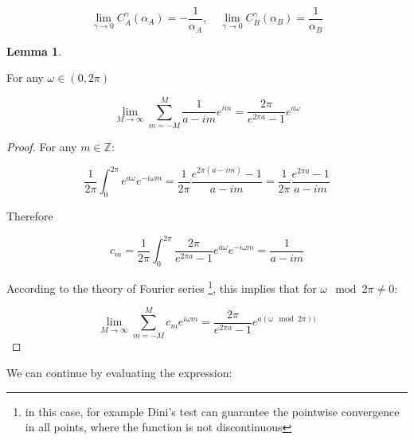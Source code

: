 \documentclass{article}
\theoremstyle{definition}
\newtheorem{lemma}{Lemma}[section]
\begin{document}
\begin{equation}
    \lim_{\gamma \to 0} C_A^\gamma(\alpha_A) = -\frac{1}{\alpha_A}, \quad
    \lim_{\gamma \to 0} C_B^\gamma(\alpha_B) = \frac{1}{\alpha_B}
\end{equation}

\begin{lemma}
\label{lemma:FourierSeriesExp}

For any $\omega \in (0,2 \pi)$

    \begin{equation}
        \lim_{M \to \infty} \sum_{m=-M}^M
        \frac{1}{a - i m} e^{i m} =
        \frac{2 \pi}{e^{2 \pi a}-1}  e^{a \omega}
    \end{equation}
    
\end{lemma}

\begin{proof}

For any $m \in \mathbb{Z}$:

    \begin{equation}
        \frac{1}{2 \pi} \int_0^{2 \pi} e^{a \omega} e^{-i \omega m} = 
        \frac{1}{2 \pi} \frac{e^{2 \pi (a - i m)}-1}{a - i m} =
        \frac{1}{2 \pi} \frac{e^{2 \pi a}-1}{a - i m}
    \end{equation}

    Therefore

    \begin{equation}
        c_m = \frac{1}{2 \pi} \int_0^{2 \pi} \frac{2 \pi}{e^{2 \pi a}-1}  e^{a \omega} e^{-i \omega m} = \frac{1}{a - i m}
    \end{equation}

    According to the theory of Fourier series \cite{book:HarmonicAnalysis,book:PartialDifferentialEquationsHilbertSpaceMethods,book:FourierAnalysis,book:TrigonometricSeries}\footnote{in this case, for example Dini's test can guarantee the pointwise convergence in all points, where the function is not discontinuous}, this implies that for $\omega \mod 2 \pi \ne 0$:

    \begin{equation}
        \lim_{M \to \infty} \sum_{m=-M}^M
        c_m e^{i \omega m} =
        \frac{2 \pi}{e^{2 \pi a}-1}  e^{a (\omega \mod 2 \pi))}
    \end{equation}
    
\end{proof}

We can continue by evaluating the expression:
\end{document}
